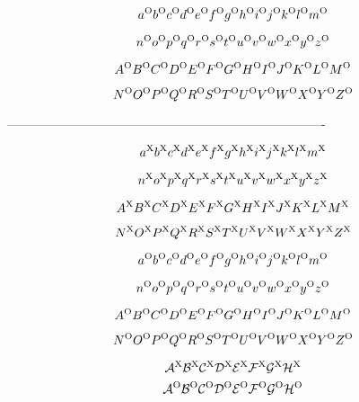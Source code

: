 $$
a^{\rm O}
b^{\rm O}
c^{\rm O}
d^{\rm O}
e^{\rm O}
f^{\rm O}
g^{\rm O}
h^{\rm O}
i^{\rm O}
j^{\rm O}
k^{\rm O}
l^{\rm O}
m^{\rm O}
$$

$$
n^{\rm O}
o^{\rm O}
p^{\rm O}
q^{\rm O}
r^{\rm O}
s^{\rm O}
t^{\rm O}
u^{\rm O}
v^{\rm O}
w^{\rm O}
x^{\rm O}
y^{\rm O}
z^{\rm O}
$$

$$
A^{\rm O}
B^{\rm O}
C^{\rm O}
D^{\rm O}
E^{\rm O}
F^{\rm O}
G^{\rm O}
H^{\rm O}
I^{\rm O}
J^{\rm O}
K^{\rm O}
L^{\rm O}
M^{\rm O}
$$

$$
N^{\rm O}
O^{\rm O}
P^{\rm O}
Q^{\rm O}
R^{\rm O}
S^{\rm O}
T^{\rm O}
U^{\rm O}
V^{\rm O}
W^{\rm O}
X^{\rm O}
Y^{\rm O}
Z^{\rm O}
$$



%
---------------------------------------------------------------------------- 

$$
a^{\rm X}
b^{\rm X}
c^{\rm X}
d^{\rm X}
e^{\rm X}
f^{\rm X}
g^{\rm X}
h^{\rm X}
i^{\rm X}
j^{\rm X}
k^{\rm X}
l^{\rm X}
m^{\rm X}
$$

$$n^{\rm X}
o^{\rm X}
p^{\rm X}
q^{\rm X}
r^{\rm X}
s^{\rm X}
t^{\rm X}
u^{\rm X}
v^{\rm X}
w^{\rm X}
x^{\rm X}
y^{\rm X}
z^{\rm X}
$$

$$
A^{\rm X}
B^{\rm X}
C^{\rm X}
D^{\rm X}
E^{\rm X}
F^{\rm X}
G^{\rm X}
H^{\rm X}
I^{\rm X}
J^{\rm X}
K^{\rm X}
L^{\rm X}
M^{\rm X}
$$

$$
N^{\rm X}
O^{\rm X}
P^{\rm X}
Q^{\rm X}
R^{\rm X}
S^{\rm X}
T^{\rm X}
U^{\rm X}
V^{\rm X}
W^{\rm X}
X^{\rm X}
Y^{\rm X}
Z^{\rm X}
$$


$$
a^{\rm O}
b^{\rm O}
c^{\rm O}
d^{\rm O}
e^{\rm O}
f^{\rm O}
g^{\rm O}
h^{\rm O}
i^{\rm O}
j^{\rm O}
k^{\rm O}
l^{\rm O}
m^{\rm O}
$$

$$
n^{\rm O}
o^{\rm O}
p^{\rm O}
q^{\rm O}
r^{\rm O}
s^{\rm O}
t^{\rm O}
u^{\rm O}
v^{\rm O}
w^{\rm O}
x^{\rm O}
y^{\rm O}
z^{\rm O}
$$

$$
A^{\rm O}
B^{\rm O}
C^{\rm O}
D^{\rm O}
E^{\rm O}
F^{\rm O}
G^{\rm O}
H^{\rm O}
I^{\rm O}
J^{\rm O}
K^{\rm O}
L^{\rm O}
M^{\rm O}
$$

$$
N^{\rm O}
O^{\rm O}
P^{\rm O}
Q^{\rm O}
R^{\rm O}
S^{\rm O}
T^{\rm O}
U^{\rm O}
V^{\rm O}
W^{\rm O}
X^{\rm O}
Y^{\rm O}
Z^{\rm O}
$$



$$
{\cal A}^{\rm X}  {\cal B}^{\rm X}  {\cal C}^{\rm X}  {\cal D}^{\rm X} 
{\cal E}^{\rm X}  {\cal F}^{\rm X}  {\cal G}^{\rm X}  {\cal H}^{\rm X}
$$
%
$$
{\cal A}^{\rm O}  {\cal B}^{\rm O}  {\cal C}^{\rm O}  {\cal D}^{\rm O} 
{\cal E}^{\rm O}  {\cal F}^{\rm O}  {\cal G}^{\rm O}  {\cal H}^{\rm O}
$$

